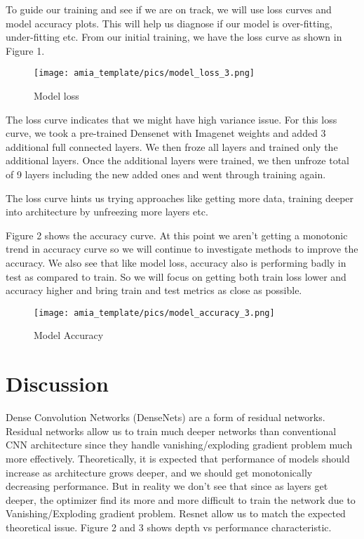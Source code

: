 \documentclass{amia}
\begin{document}
To guide our training and see if we are on track, we will use loss curves and model accuracy plots. This will help us diagnose if our model is over-fitting, under-fitting etc. From our initial training, we have the loss curve as shown in Figure 1.

\begin{figure}[h!]
\centering
\texttt{[image: amia\_template/pics/model\_loss\_3.png]}
\caption{Model loss}
\label{fig1}
\end{figure}

The loss curve indicates that we might have high variance issue. For this loss curve, we took a pre-trained Densenet with Imagenet weights and added 3 additional full connected layers. We then froze all layers and trained only the additional layers. Once the additional layers were trained, we then unfroze total of 9 layers including the new added ones and went through training again.

The loss curve hints us trying approaches like getting more data, training deeper into architecture by unfreezing more layers etc.

Figure 2 shows the accuracy curve. At this point we aren't getting a monotonic trend in accuracy curve so we will continue to investigate methods to improve the accuracy. We also see that like model loss, accuracy also is performing badly in test as compared to train. So we will focus on getting both train loss lower and accuracy higher and bring train and test metrics as close as possible.

\begin{figure}[h!]
\centering
\texttt{[image: amia\_template/pics/model\_accuracy\_3.png]}
\caption{Model Accuracy}
\label{fig2}
\end{figure}


\section*{Discussion}
Dense Convolution Networks (DenseNets) are a form of residual networks. Residual networks allow us to train much deeper networks than conventional CNN architecture since they handle vanishing/exploding gradient problem much more effectively. Theoretically, it is expected that performance of models should increase as architecture grows deeper, and we should get monotonically decreasing performance. But in reality we don't see that since as layers get deeper, the optimizer find its more and more difficult to train the network due to Vanishing/Exploding gradient problem. Resnet allow us to match the expected theoretical issue. Figure 2 and 3 shows depth vs performance characteristic.
\end{document}
